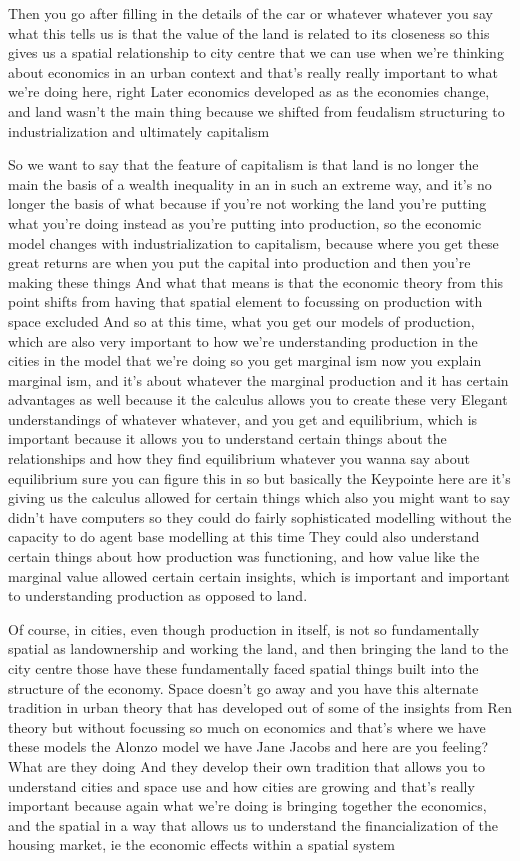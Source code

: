 Then you go after filling in the details of the car or whatever whatever you say what this tells us is that the value of the land is related to its closeness so this gives us a spatial relationship to city centre that we can use when we’re thinking about economics in an urban context and that’s really really important to what we’re doing here, right
Later economics developed as as the economies change, and land wasn’t the main thing because we shifted from feudalism structuring to industrialization and ultimately capitalism

So we want to say that the feature of capitalism is that land is no longer the main the basis of a wealth inequality in an in such an extreme way, and it’s no longer the basis of what because if you’re not working the land you’re putting what you’re doing instead as you’re putting into production, so the economic model changes with industrialization to capitalism, because where you get these great returns are when you put the capital into production and then you’re making these things
And what that means is that the economic theory from this point shifts from having that spatial element to focussing on production with space excluded
And so at this time, what you get our models of production, which are also very important to how we’re understanding production in the cities in the model that we’re doing so you get marginal ism now you explain marginal ism, and it’s about whatever the marginal production and it has certain advantages as well because it the calculus allows you to create these very Elegant understandings of whatever whatever, and you get and equilibrium, which is important because it allows you to understand certain things about the relationships and how they find equilibrium whatever you wanna say about equilibrium sure you can figure this in so but basically the Keypointe here are it’s giving us the calculus allowed for certain things which also you might want to say didn’t have computers so they could do fairly sophisticated modelling without the capacity to do agent base modelling at this time They could also understand certain things about how production was functioning, and how value like the marginal value allowed certain certain insights, which is important and important to understanding production as opposed to land.

Of course, in cities, even though production in itself, is not so fundamentally spatial as landownership and working the land, and then bringing the land to the city centre those have these fundamentally faced spatial things built into the structure of the economy. Space doesn’t go away and you have this alternate tradition in urban theory that has developed out of some of the insights from Ren theory but without focussing so much on economics and that’s where we have these models the Alonzo model we have Jane Jacobs and here are you feeling? What are they doing And they develop their own tradition that allows you to understand cities and space use and how cities are growing and that’s really important because again what we’re doing is bringing together the economics, and the spatial in a way that allows us to understand the financialization of the housing market, ie the economic effects within a spatial system

